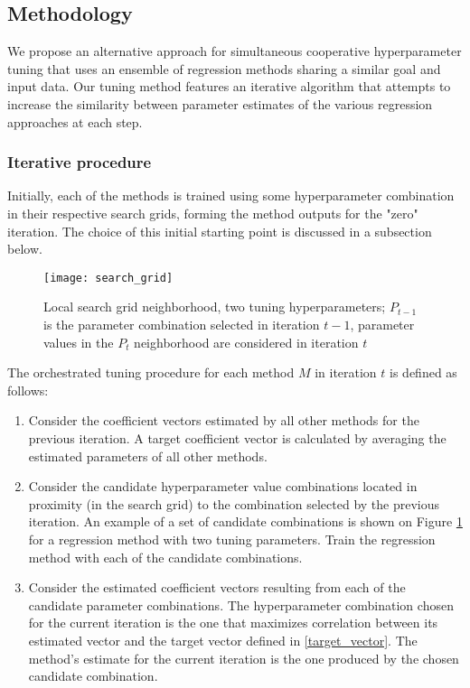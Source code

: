 \subsection{Methodology} \label{sec:orc_meth}
We propose an alternative approach for simultaneous cooperative hyperparameter tuning that uses an ensemble of regression methods sharing a similar goal and input data. Our tuning method features an iterative algorithm that attempts to increase the similarity between parameter estimates of the various regression approaches at each step.

\subsubsection{Iterative procedure}
Initially, each of the methods is trained using some hyperparameter combination in their respective search grids, forming the method outputs for the "zero" iteration. The choice of this initial starting point is discussed in a subsection below.

\begin{figure}[H]
	\centering
	\texttt{[image: search\_grid]}
	\caption{Local search grid neighborhood, two tuning hyperparameters; $P_{t-1}$ is the parameter combination selected in iteration $t-1$, parameter values in the $P_t$ neighborhood are considered in iteration $t$}
	\label{fig:orc_tun_search_grid}
\end{figure}

The orchestrated tuning procedure for each method $M$ in iteration $t$ is defined as follows:
\begin{enumerate}
	\item \label{target_vector} Consider the coefficient vectors estimated by all other methods for the previous iteration. A target coefficient vector is calculated by averaging the estimated parameters of all other methods.
	\item \label{cand_comb} Consider the candidate hyperparameter value combinations located in proximity (in the search grid) to the combination selected by the previous iteration. An example of a set of candidate combinations is shown on Figure \ref{fig:orc_tun_search_grid} for a regression method with two tuning parameters. Train the regression method with each of the candidate combinations.
	\item Consider the estimated coefficient vectors resulting from each of the candidate parameter combinations. The hyperparameter combination chosen for the current iteration is the one that maximizes correlation between its estimated vector and the target vector defined in \ref{target_vector}. The method's estimate for the current iteration is the one produced by the chosen candidate combination.
\end{enumerate}


